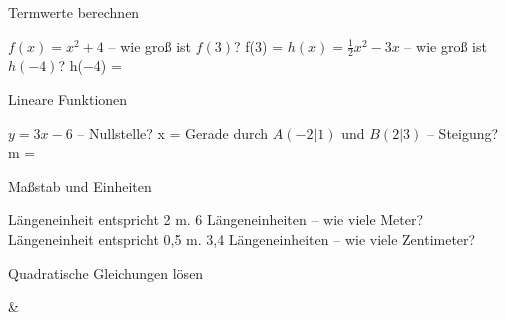 \setcounter{aufgabe}{0}

\begin{aufgabe}{Termwerte berechnen}
\begin{teile}
\teil $f(x) = x^2 + 4$ – wie groß ist $f(3)$? f(3) = \leerfeld
\teil $h(x) = \frac{1}{2}x^2 - 3x$ – wie groß ist $h(-4)$? h(−4) = \leerfeld
\end{teile}
\end{aufgabe}

\begin{aufgabe}{Lineare Funktionen}
\begin{teile}
\teil $y = 3x - 6$ – Nullstelle? x = \leerfeld
\teil Gerade durch $A(-2 | 1)$ und $B(2 | 3)$ – Steigung? m = \leerfeld
\end{teile}
\end{aufgabe}

\begin{aufgabe}{Maßstab und Einheiten}
\begin{teile}
 Längeneinheit entspricht 2 m. 6 Längeneinheiten – wie viele Meter? \leerfeld[m]
 Längeneinheit entspricht 0,5 m. 3,4 Längeneinheiten – wie viele Zentimeter? \leerfeld[cm]
\end{teile}
\end{aufgabe}

\begin{aufgabe}{Quadratische Gleichungen lösen}
\begin{gleichungsraster}[2]
 &
 \\
\end{gleichungsraster}
\end{aufgabe}

